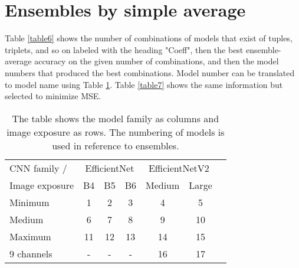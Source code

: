 \documentclass[10pt,letterpaper]{article}
\begin{document}
\pagebreak





\pagebreak

\section*{Ensembles by simple average}
\centering

Table \ref{table6} shows the number of combinations of models that exist
of tuples, triplets, and so on labeled with the heading "Coeff", then
the best ensemble-average accuracy on the given number of combinations,
and then the model numbers that produced the best combinations. Model number can be
translated to model name using Table \ref{table1}. Table \ref{table7}
shows the same information but selected to minimize MSE. 

\begin{table}[hbt!]
\caption{The table shows the model family as columns and image exposure as rows. The numbering of models is used in reference to ensembles.}
\begin{tabular}{ |l|c|c|c|c|c|c| }
\hline
CNN family / & \multicolumn{3}{c|}{EfficientNet} & \multicolumn{2}{c|}{EfficientNetV2} \\
Image exposure & B4 & B5 & B6 &Medium &Large  \\ 
\hline
Minimum & 1 & 2 & 3 & 4 & 5  \\ 
Medium & 6 & 7 & 8 & 9 & 10  \\ 
Maximum & 11 & 12 & 13 & 14 & 15  \\ 
9 channels & - & - & - & 16 & 17  \\ 
\hline
\end{tabular}
\label{table1}
\end{table}
\end{document}
